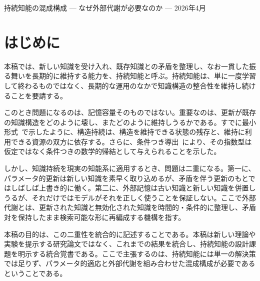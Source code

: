 \documentclass[12pt,a4paper]{article}
\begin{document}
\PaperTitleBlock
  {持続知能の混成構成}
  {--- なぜ外部代謝が必要なのか ---}
  {2026年4月}

\begin{abstract}
持続的に運用される知能系は、新しい知識を学び、矛盾を処理し、過去の知識構造を壊しすぎずに維持しなければならない。本稿は、この課題に対して、パラメータ的適応だけでも、外部記憶だけでも十分ではないことを論じる。これまでの一連の結果は、構造持続の最小形式~\cite{paper1}、条件つきの指数導出~\cite{paper2}、論理一貫性維持の具体例~\cite{paper3}、そして前提認識型の継続学習実験~\cite{paper4}を通じて、知識持続の失敗が構造損失として理解できることを示してきた。本稿では、それらを統合し、持続知能には少なくとも三つの能力が必要であることを主張する。すなわち、(1)~新しい状況への迅速なパラメータ的適応、(2)~矛盾と更新を長期的に整理する外部代謝、(3)~取得・整理された知識を実際の応答に反映する応答生成である。本稿の主張は、知識持続の問題が単なる記憶容量の問題ではなく、構造損失、矛盾処理、応答生成の三層からなるという点にある。
\end{abstract}

\section{はじめに}

本稿では、新しい知識を受け入れ、既存知識との矛盾を整理し、なお一貫した振る舞いを長期的に維持する能力を、持続知能と呼ぶ。持続知能は、単に一度学習して終わるものではなく、長期的な運用のなかで知識構造の整合性を維持し続けることを要請する。

このとき問題になるのは、記憶容量そのものではない。重要なのは、更新が既存の知識構造をどのように壊し、またどのように維持しうるかである。すでに最小形式~\cite{paper1}で示したように、構造持続は、構造を維持できる状態の残存と、維持に利用できる資源の双方に依存する。さらに、条件つき導出~\cite{paper2}により、その指数型は仮定ではなく条件つきの数学的帰結として与えられることを示した。

しかし、知識持続を現実の知能系に適用するとき、問題は二重になる。第一に、パラメータ的更新は新しい知識を素早く取り込めるが、矛盾を伴う更新のもとではしばしば上書き的に働く。第二に、外部記憶は古い知識と新しい知識を併置しうるが、それだけではモデルがそれを正しく使うことを保証しない。ここで外部代謝とは、更新された知識と無効化された知識を時間的・条件的に整理し、矛盾対を保持したまま検索可能な形に再編成する機構を指す。

本稿の目的は、この二重性を統合的に記述することである。本稿は新しい理論や実験を提示する研究論文ではなく、これまでの結果を統合し、持続知能の設計課題を明示する統合覚書である。ここで主張するのは、持続知能には単一の解決策では足りず、パラメータ的適応と外部代謝を組み合わせた混成構成が必要であるということである。
\end{document}

